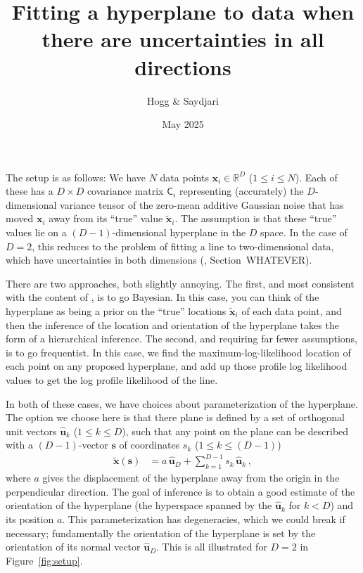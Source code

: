 \documentclass{article}
\title{\bfseries Fitting a hyperplane to data when there are uncertainties in all directions}
\author{Hogg \& Saydjari}
\date{May 2025}
\renewcommand{\figurename}{Figure}
\newcommand{\figref}[1]{\figurename~\ref{#1}}
\renewcommand{\vec}[1]{\bm{#1}}
\newcommand{\mat}[1]{\mathsf{#1}}
\begin{document}
\maketitle\thispagestyle{empty}

The setup is as follows:
We have $N$ data points $\vec{x}_i\in\mathbb{R}^D$ ($1\leq i\leq N$).
Each of these has a $D\times D$ covariance matrix $\mat{C}_i$ representing (accurately) the $D$-dimensional variance tensor of the zero-mean additive Gaussian noise that has moved $\vec{x}_i$ away from its ``true'' value $\vec{\tilde{x}}_i$.
The assumption is that these ``true'' values lie on a $(D-1)$-dimensional hyperplane in the $D$ space.
In the case of $D=2$, this reduces to the problem of fitting a line to two-dimensional data, which have uncertainties in both dimensions (\cite{HBL}, Section~WHATEVER).

There are two approaches, both slightly annoying.
The first, and most consistent with the content of \cite{HBL}, is to go Bayesian.
In this case, you can think of the hyperplane as being a prior on the ``true'' locations $\vec{\tilde{x}}_i$ of each data point, and then the inference of the location and orientation of the hyperplane takes the form of a hierarchical inference.
The second, and requiring far fewer assumptions, is to go frequentist.
In this case, we find the maximum-log-likelihood location of each point on any proposed hyperplane, and add up those profile log likelihood values to get the log profile likelihood of the line.

In both of these cases, we have choices about parameterization of the hyperplane.
The option we choose here is that there plane is defined by a set of orthogonal unit vectors $\vec{\hat{u}}_k$ ($1\leq k\leq D$), such that any point on the plane can be described with a $(D-1)$-vector $\vec{s}$ of coordinates $s_k$ ($1\leq k\leq (D-1)$)
\begin{align}
    \vec{\tilde{x}}(\vec{s}) &= a\,\vec{\hat{u}}_D + \sum_{k=1}^{D-1} s_k\,\vec{\hat{u}}_k ~,
\end{align}
where $a$ gives the displacement of the hyperplane away from the origin in the perpendicular direction.
The goal of inference is to obtain a good estimate of the orientation of the hyperplane (the hyperspace spanned by the $\vec{\hat{u}}_k$ for $k<D$) and its position $a$.
This parameterization has degeneracies, which we could break if necessary;
fundamentally the orientation of the hyperplane is set by the orientation of its normal vector $\vec{\hat{u}}_D$.
This is all illustrated for $D=2$ in \figref{fig:setup}.
\end{document}
